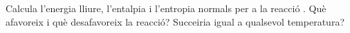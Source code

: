 \begin{exr}{}
    Calcula l'energia lliure, l'entalpia i l'entropia normals per a la reacció . Què afavoreix i què desafavoreix la reacció? Succeiria igual a qualsevol temperatura?
    \end{exr}

